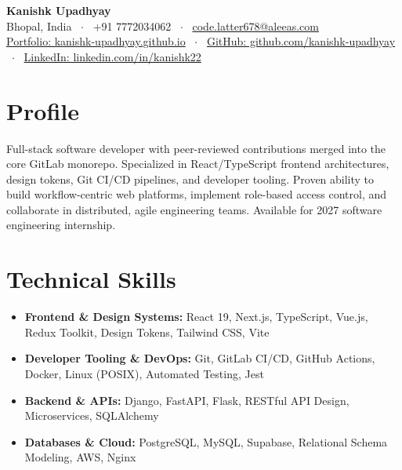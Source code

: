\documentclass[10pt,a4paper]{article}
\begin{document}
\begin{center}
    {\huge \textbf{Kanishk Upadhyay}} \\ \vspace{2pt}
    Bhopal, India \ $\cdot$ \ +91 7772034062 \ $\cdot$ \ \href{mailto:code.latter678@aleeas.com}{code.latter678@aleeas.com} \\ \vspace{2pt}
    \href{https://kanishk-upadhyay.github.io/}{Portfolio: kanishk-upadhyay.github.io} \ $\cdot$ \ 
    \href{https://github.com/kanishk-upadhyay}{GitHub: github.com/kanishk-upadhyay} \ $\cdot$ \ 
    \href{https://linkedin.com/in/kanishk22}{LinkedIn: linkedin.com/in/kanishk22}
\end{center}

\vspace{-6pt}
\section{Profile}
Full-stack software developer with peer-reviewed contributions merged into the core GitLab monorepo. Specialized in React/TypeScript frontend architectures, design tokens, Git CI/CD pipelines, and developer tooling. Proven ability to build workflow-centric web platforms, implement role-based access control, and collaborate in distributed, agile engineering teams. Available for 2027 software engineering internship.

\section{Technical Skills}
\begin{itemize}
    \item \textbf{Frontend \& Design Systems:} React 19, Next.js, TypeScript, Vue.js, Redux Toolkit, Design Tokens, Tailwind CSS, Vite
    \item \textbf{Developer Tooling \& DevOps:} Git, GitLab CI/CD, GitHub Actions, Docker, Linux (POSIX), Automated Testing, Jest
    \item \textbf{Backend \& APIs:} Django, FastAPI, Flask, RESTful API Design, Microservices, SQLAlchemy
    \item \textbf{Databases \& Cloud:} PostgreSQL, MySQL, Supabase, Relational Schema Modeling, AWS, Nginx
\end{itemize}
\end{document}
